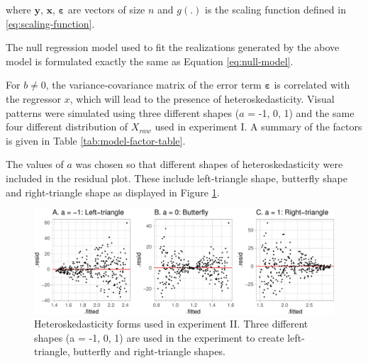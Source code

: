 \documentclass[]{interact}
\theoremstyle{plain}%
\theoremstyle{definition}
\theoremstyle{remark}
\begin{document}
\noindent where \(\boldsymbol{y}\), \(\boldsymbol{x}\),
\(\boldsymbol{\varepsilon}\) are vectors of size \(n\) and \(g(.)\) is
the scaling function defined in \ref{eq:scaling-function}.

The null regression model used to fit the realizations generated by the
above model is formulated exactly the same as Equation
\ref{eq:null-model}.

For \(b \neq 0\), the variance-covariance matrix of the error term
\(\boldsymbol{\varepsilon}\) is correlated with the regressor \(x\),
which will lead to the presence of heteroskedasticity. Visual patterns
were simulated using three different shapes (\(a\) = -1, 0, 1) and the
same four different distribution of \(X_{raw}\) used in experiment I. A
summary of the factors is given in Table \ref{tab:model-factor-table}.

The values of \(a\) was chosen so that different shapes of
heteroskedasticity were included in the residual plot. These include
left-triangle shape, butterfly shape and right-triangle shape as
displayed in Figure \ref{fig:different-shape-of-heter}.

\begin{figure}

{\centering \includegraphics[width=1\linewidth]{paper_comparison_files/figure-latex/different-shape-of-heter-1} 

}

\caption{Heteroskedasticity forms used in experiment II. Three different shapes (a = -1, 0, 1) are used in the experiment to create left-triangle, butterfly and right-triangle shapes.}\label{fig:different-shape-of-heter}
\end{figure}
\end{document}
